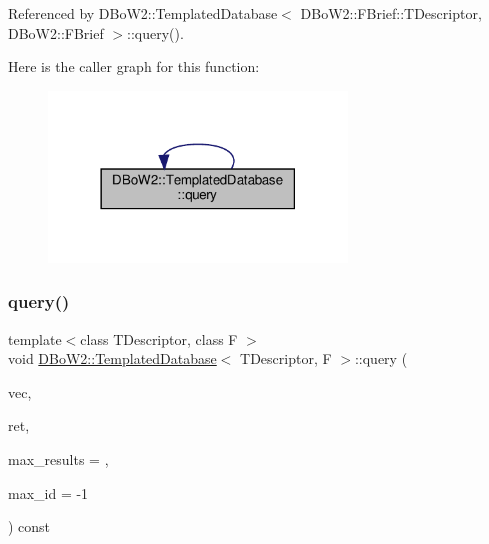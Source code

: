 Referenced by D\+Bo\+W2\+::\+Templated\+Database$<$ D\+Bo\+W2\+::\+F\+Brief\+::\+T\+Descriptor, D\+Bo\+W2\+::\+F\+Brief $>$\+::query().

Here is the caller graph for this function\+:\nopagebreak
\begin{figure}[H]
\begin{center}
\leavevmode
\includegraphics[width=225pt]{classDBoW2_1_1TemplatedDatabase_aea53ba2ef3cbfe8fa9eaaa8152e16c85_icgraph}
\end{center}
\end{figure}
\mbox{\label{classDBoW2_1_1TemplatedDatabase_a27b2365cd82bf44bd41c20bc37d698ec}} 
\subsubsection{\texorpdfstring{query()}{query()}\hspace{0.1cm}{\footnotesize\ttfamily [2/2]}}
{\footnotesize\ttfamily template$<$class T\+Descriptor, class F $>$ \\
void \hyperlink{classDBoW2_1_1TemplatedDatabase}{D\+Bo\+W2\+::\+Templated\+Database}$<$ T\+Descriptor, F $>$\+::query (\begin{DoxyParamCaption}\item[{const \hyperlink{classDBoW2_1_1BowVector}{Bow\+Vector} \&}]{vec,  }\item[{\hyperlink{classDBoW2_1_1QueryResults}{Query\+Results} \&}]{ret,  }\item[{int}]{max\+\_\+results = {},  }\item[{int}]{max\+\_\+id = {\ttfamily -\/1} }\end{DoxyParamCaption}) const}

